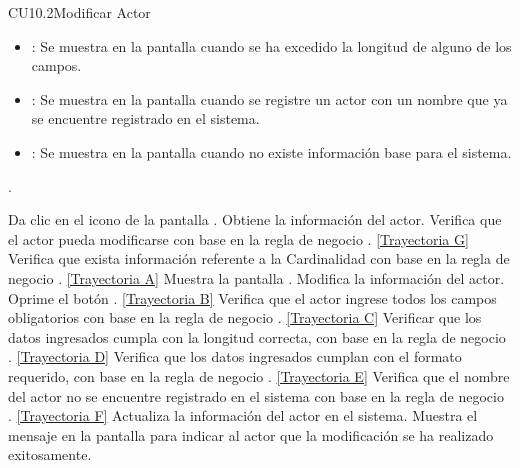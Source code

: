 \begin{UseCase}{CU10.2}{Modificar Actor}
{\begin{itemize}
		\item {}: Se muestra en la pantalla  cuando se ha excedido la longitud de alguno de los campos.
		\item {}: Se muestra en la pantalla  cuando se registre un actor con un nombre que ya se encuentre registrado en el sistema.
		\item {}: Se muestra en la pantalla  cuando no existe información base para el sistema.
		\end{itemize}.
		}
	\end{UseCase}
	\begin{UCtrayectoria}
		\UCpaso[\UCactor] Da clic en el icono \editar de la pantalla .
		\UCpaso[\UCsist] Obtiene la información del actor.
		\UCpaso[\UCsist] Verifica que el actor pueda modificarse con base en la regla de negocio . \hyperlink{CU10-2:TAG}{[Trayectoria G]}
		\UCpaso[\UCactor] Verifica que exista información referente a la Cardinalidad con base en la regla de negocio . \hyperlink{CU10-2:TAA}{[Trayectoria A]}
		\UCpaso[\UCsist] Muestra la pantalla .
		\UCpaso[\UCactor] Modifica la información del actor. \label{CU10.2-P6}
		\UCpaso[\UCactor] Oprime el botón . \hyperlink{CU10-2:TAB}{[Trayectoria B]} 
		\UCpaso[\UCsist] Verifica que el actor ingrese todos los campos obligatorios con base en la regla de negocio . \hyperlink{CU10-2:TAC}{[Trayectoria C]}
		\UCpaso[\UCsist] Verificar que los datos ingresados cumpla con la longitud correcta, con base en la regla de negocio . \hyperlink{CU10-2:TAD}{[Trayectoria D]}
		\UCpaso[\UCsist] Verifica que los datos ingresados cumplan con el formato requerido, con base en la regla de negocio . \hyperlink{CU10-2:TAE}{[Trayectoria E]}
		\UCpaso[\UCsist] Verifica que el nombre del actor no se encuentre registrado en el sistema con base en la regla de negocio . \hyperlink{CU10-2:TAF}{[Trayectoria F]} 
		\UCpaso[\UCsist] Actualiza la información del actor en el sistema.
		\UCpaso[\UCsist] Muestra el mensaje  en la pantalla  para indicar al actor que la modificación se ha realizado exitosamente.
	\end{UCtrayectoria}		
